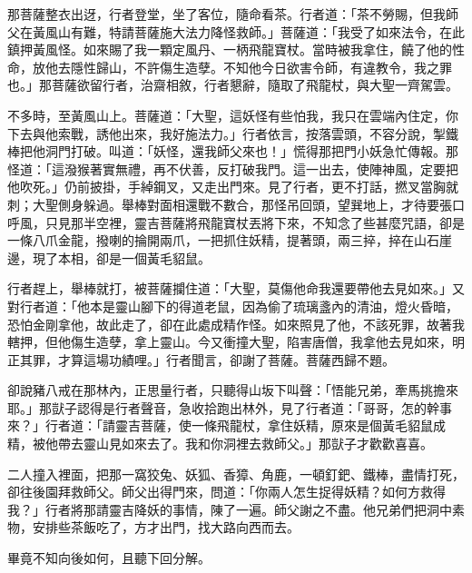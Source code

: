 那菩薩整衣出迓，行者登堂，坐了客位，隨命看茶。行者道：「茶不勞賜，但我師父在黃風山有難，特請菩薩施大法力降怪救師。」菩薩道：「我受了如來法令，在此鎮押黃風怪。如來賜了我一顆定風丹、一柄飛龍寶杖。當時被我拿住，饒了他的性命，放他去隱性歸山，不許傷生造孽。不知他今日欲害令師，有違教令，我之罪也。」那菩薩欲留行者，治齋相敘，行者懇辭，隨取了飛龍杖，與大聖一齊駕雲。

不多時，至黃風山上。菩薩道：「大聖，這妖怪有些怕我，我只在雲端內住定，你下去與他索戰，誘他出來，我好施法力。」行者依言，按落雲頭，不容分說，掣鐵棒把他洞門打破。叫道：「妖怪，還我師父來也！」慌得那把門小妖急忙傳報。那怪道：「這潑猴著實無禮，再不伏善，反打破我門。這一出去，使陣神風，定要把他吹死。」仍前披掛，手綽鋼叉，又走出門來。見了行者，更不打話，撚叉當胸就刺；大聖側身躲過。舉棒對面相還戰不數合，那怪吊回頭，望巽地上，才待要張口呼風，只見那半空裡，靈吉菩薩將飛龍寶杖丟將下來，不知念了些甚麼咒語，卻是一條八爪金龍，撥喇的掄開兩爪，一把抓住妖精，提著頭，兩三捽，捽在山石崖邊，現了本相，卻是一個黃毛貂鼠。

行者趕上，舉棒就打，被菩薩攔住道：「大聖，莫傷他命我還要帶他去見如來。」又對行者道：「他本是靈山腳下的得道老鼠，因為偷了琉璃盞內的清油，燈火昏暗，恐怕金剛拿他，故此走了，卻在此處成精作怪。如來照見了他，不該死罪，故著我轄押，但他傷生造孽，拿上靈山。今又衝撞大聖，陷害唐僧，我拿他去見如來，明正其罪，才算這場功績哩。」行者聞言，卻謝了菩薩。菩薩西歸不題。

卻說豬八戒在那林內，正思量行者，只聽得山坂下叫聲：「悟能兄弟，牽馬挑擔來耶。」那獃子認得是行者聲音，急收拾跑出林外，見了行者道：「哥哥，怎的幹事來？」行者道：「請靈吉菩薩，使一條飛龍杖，拿住妖精，原來是個黃毛貂鼠成精，被他帶去靈山見如來去了。我和你洞裡去救師父。」那獃子才歡歡喜喜。

二人撞入裡面，把那一窩狡兔、妖狐、香獐、角鹿，一頓釘鈀、鐵棒，盡情打死，卻往後園拜救師父。師父出得門來，問道：「你兩人怎生捉得妖精？如何方救得我？」行者將那請靈吉降妖的事情，陳了一遍。師父謝之不盡。他兄弟們把洞中素物，安排些茶飯吃了，方才出門，找大路向西而去。

畢竟不知向後如何，且聽下回分解。
